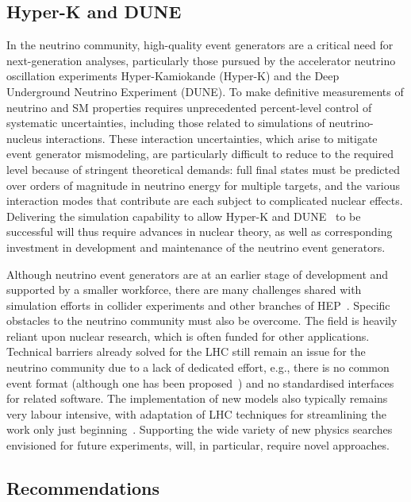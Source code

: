 \documentclass[10pt,a4paper]{article}
\begin{document}
\subsection{Hyper-K and DUNE}\label{hyper-k-and-dune}

In the neutrino community, high-quality event generators are a critical need for
next-generation analyses, particularly those pursued by the accelerator neutrino
oscillation experiments Hyper-Kamiokande (Hyper-K) and the Deep Underground
Neutrino Experiment (DUNE). To make definitive measurements of neutrino and SM
properties requires unprecedented percent-level control of systematic
uncertainties, including those related to simulations of neutrino-nucleus
interactions. These interaction uncertainties, which arise to mitigate event
generator mismodeling, are particularly difficult to reduce to the required
level because of stringent theoretical demands: full final states must be
predicted over orders of magnitude in neutrino energy for multiple targets, and
the various interaction modes that contribute are each subject to complicated
nuclear effects. Delivering the simulation capability to allow Hyper-K and DUNE~\cite{DUNE_EPPSU}
to be successful will thus require advances in nuclear theory, as well as
corresponding investment in development and maintenance of the neutrino event
generators.

Although neutrino event generators are at an earlier stage of development and
supported by a smaller workforce, there are many challenges shared with
simulation efforts in collider experiments and other branches of
HEP~\cite{campbell2024eg}. Specific obstacles to the neutrino community must also be
overcome. The field is heavily reliant upon nuclear research, which is often
funded for other applications. Technical barriers already solved for the LHC
still remain an issue for the neutrino community due to a lack of dedicated
effort, e.g., there is no common event format (although one has 
been proposed~\cite{gardiner2024nuhepmc}) and no standardised interfaces for related
software. The implementation of new models also typically remains very labour
intensive, with adaptation of LHC techniques for streamlining the work only just
beginning~\cite{PhysRevD.105.096006}. Supporting the
wide variety of new physics searches envisioned for future experiments, will, in
particular, require novel approaches.

\subsection{Recommendations}\label{recommendations}
\end{document}
